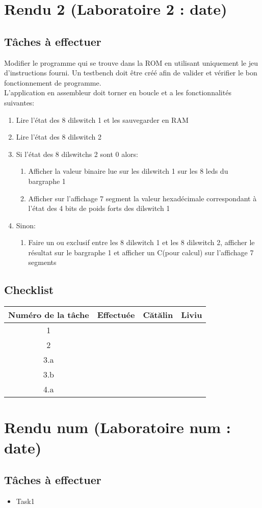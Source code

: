 \documentclass{article}
\begin{document}
    \section{Rendu 2 (Laboratoire 2 : date) }
    \subsection{Tâches à effectuer}
    Modifier le programme qui se trouve dans la ROM en utilisant uniquement le jeu d'instructions fourni. Un testbench doit être créé afin de valider et vérifier le bon fonctionnement de programme. \\
    L'application en assembleur doit torner en boucle et a les fonctionnalités suivantes:
    \begin{enumerate}
        \item Lire l'état des 8 dilswitch 1 et les sauvegarder en RAM
        \item Lire l'état des 8 dilswitch 2
        \item Si l'état des 8 dilswitchs 2 sont 0 alors:
        \begin{enumerate}
            \item Afficher la valeur binaire lue sur les dilswitch 1 sur les 8 leds du bargraphe 1
            \item Afficher sur l'affichage 7 segment la valeur hexadécimale correspondant à l'état des 4 bits de poids forts des dilswitch 1 
        \end{enumerate}
        \item Sinon:
        \begin{enumerate}
            \item Faire un ou exclusif entre les 8 dilswitch 1 et les 8 dilswitch 2, afficher le résultat sur le bargraphe 1 et afficher un C(pour calcul) sur l'affichage 7 segments
        \end{enumerate}
    \end{enumerate}
    \subsection{Checklist}
    \begin{center}
        \begin{tabular}{|c|c|c|c|}
            \hline
            Numéro de la tâche & Effectuée & Cătălin & Liviu \\
            \hline
            \hline 1 &   &   &   \\ 
            \hline 2 &   &   &   \\
            \hline 3.a &   &   &   \\
            \hline 3.b &   &   &   \\
            \hline 4.a &   &   &   \\
            \hline
        \end{tabular}
    \end{center}
    \newpage

    \section{Rendu num (Laboratoire num : date) }
    \subsection{Tâches à effectuer}
    \begin{itemize}
        \item Task1
    \end{itemize}
    \newpage
\end{document}
